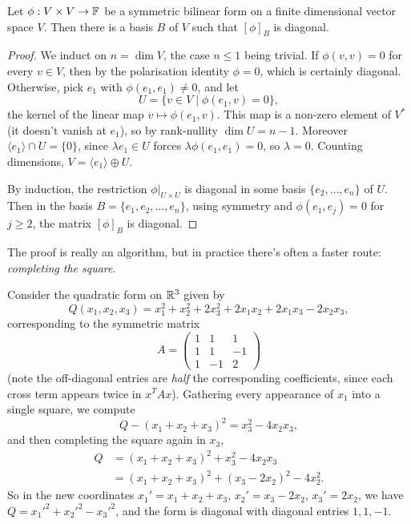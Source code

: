 \documentclass[a4paper]{scrartcl}
\begin{document}
\begin{theorem}
    Let $\phi: V \times V \rightarrow \mathbb{F}$ be a symmetric bilinear form on a finite dimensional vector space $V$. Then there is a basis $B$ of $V$ such that $[\phi]_B$ is diagonal.
\end{theorem}
\begin{proof}
    We induct on $n = \dim V$, the case $n \leq 1$ being trivial. If $\phi(v, v) = 0$ for every $v \in V$, then by the polarisation identity $\phi = 0$, which is certainly diagonal. Otherwise, pick $e_1$ with $\phi(e_1, e_1) \neq 0$, and let
    $$
    U = \{v \in V \mid \phi(e_1, v) = 0\},
    $$
    the kernel of the linear map $v \mapsto \phi(e_1, v)$. This map is a non-zero element of $V^*$ (it doesn't vanish at $e_1$), so by rank-nullity $\dim U = n - 1$. Moreover $\langle e_1 \rangle \cap U = \{0\}$, since $\lambda e_1 \in U$ forces $\lambda \phi(e_1, e_1) = 0$, so $\lambda = 0$. Counting dimensions, $V = \langle e_1 \rangle \oplus U$.

    By induction, the restriction $\phi|_{U \times U}$ is diagonal in some basis $\{e_2, \dots, e_n\}$ of $U$. Then in the basis $B = \{e_1, e_2, \dots, e_n\}$, using symmetry and $\phi(e_1, e_j) = 0$ for $j \geq 2$, the matrix $[\phi]_B$ is diagonal.
\end{proof}

The proof is really an algorithm, but in practice there's often a faster route: \emph{completing the square}.

\begin{example}
    Consider the quadratic form on $\mathbb{R}^3$ given by
    $$
    Q(x_1, x_2, x_3) = x_1^2 + x_2^2 + 2x_3^2 + 2x_1x_2 + 2x_1 x_3 - 2x_2x_3,
    $$
    corresponding to the symmetric matrix
    $$
    A = \begin{pmatrix}
        1 & 1 & 1 \\
        1 & 1 & -1 \\
        1 & -1 & 2
    \end{pmatrix}
    $$
    (note the off-diagonal entries are \emph{half} the corresponding coefficients, since each cross term appears twice in $x^TAx$). Gathering every appearance of $x_1$ into a single square, we compute
    $$
    Q - (x_1 + x_2 + x_3)^2 = x_3^2 - 4x_2 x_3,
    $$
    and then completing the square again in $x_3$,
    \begin{align*}
        Q &= (x_1 + x_2 + x_3)^2 + x_3^2 - 4x_2x_3 \\
        &= (x_1 + x_2 + x_3)^2 + (x_3 - 2x_2)^2 - 4x_2^2.
    \end{align*}
    So in the new coordinates $x_1' = x_1 + x_2 + x_3$, $x_2' = x_3 - 2x_2$, $x_3' = 2x_2$, we have $Q = x_1'^2 + x_2'^2 - x_3'^2$, and the form is diagonal with diagonal entries $1, 1, -1$.
\end{example}
\end{document}
